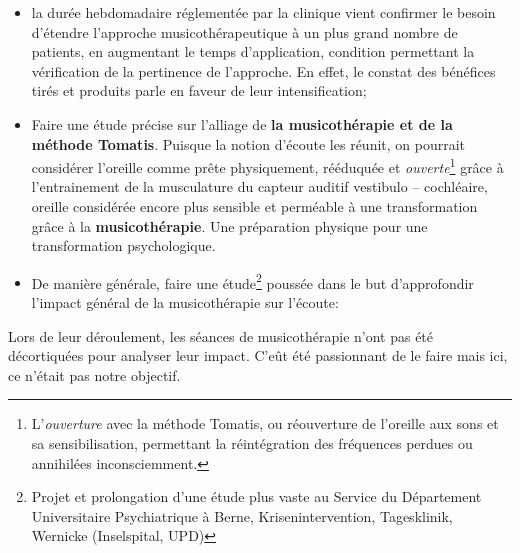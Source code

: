 \begin{itemize}
     \item la durée hebdomadaire réglementée par la clinique vient
       confirmer le besoin d'étendre l'approche musicothérapeutique à
       un plus grand nombre de patients, en augmentant le temps
       d'application, condition permettant la vérification de la
       pertinence de l'approche. En effet, le constat des bénéfices
       tirés et
       produits parle en faveur de leur intensification;



 \item
     Faire une étude précise sur l'alliage de \textbf{la
       musicothérapie et de la méthode Tomatis}. Puisque la notion d'écoute les réunit, on
     pourrait considérer l'oreille comme
prête physiquement, rééduquée et \textit{ouverte}\footnote{L'\emph{ouverture} avec la méthode Tomatis, ou réouverture de l'oreille
aux sons et sa sensibilisation, permettant la réintégration
des fréquences perdues ou annihilées inconsciemment. }  grâce à l'entrainement de la musculature du capteur auditif
vestibulo -- cochléaire, oreille considérée encore plus sensible et perméable à une transformation  grâce à la \textbf{musicothérapie}.
Une préparation  physique pour une transformation psychologique.
\item De manière générale, faire une étude\footnote{ Projet et
prolongation d'une étude plus vaste au Service du
Département Universitaire Psychiatrique à Berne, Krisenintervention,
Tagesklinik, Wernicke (Inselspital, UPD) } poussée dans le but d'approfondir l'impact général de la
  musicothérapie sur l'écoute:

\end{itemize}








Lors de leur déroulement, les séances de
              musicothérapie n'ont pas été
décortiquées pour analyser leur impact. C'eût
été passionnant de le faire mais ici, ce n'était pas notre objectif.


